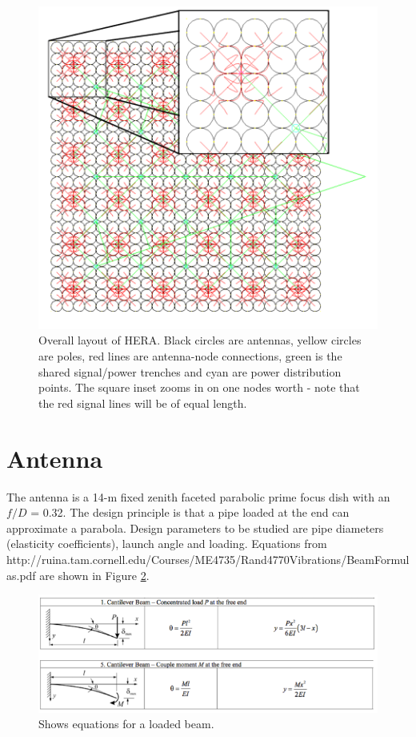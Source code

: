 \documentclass[11pt]{article}
\begin{document}
\begin{figure}[H]
\centering
\includegraphics[width=12cm]{plots/heraconfig576.png}
\caption{Overall layout of HERA.  Black circles are antennas, yellow circles are poles, red lines are antenna-node connections,  green is the shared signal/power trenches and cyan are power distribution points.  The square inset zooms in on one nodes worth - note that the red signal lines will be of equal length. }
\label{fig:heraconfig576}
\end{figure}

\section{Antenna}
The antenna is a 14-m fixed zenith faceted parabolic prime focus dish with an $f/D$ = 0.32.  The design principle is that a pipe loaded at the end can approximate a parabola.  Design parameters to be studied are pipe diameters (elasticity coefficients), launch angle and loading. Equations from
http://ruina.tam.cornell.edu/Courses/ME4735/Rand4770Vibrations/BeamFormulas.pdf
are shown in Figure \ref{fig:beam}.

\begin{figure}[H]
\centering
\includegraphics[width=\textwidth]{plots/beam.png}
\caption{Shows equations for a loaded beam.}
\label{fig:beam}
\end{figure}
\end{document}
